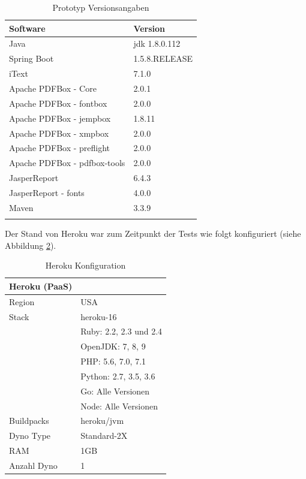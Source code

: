 \documentclass[main.tex]{subfiles}
\begin{document}
\begin{table}[!ht]
\centering
\begin{tabular}{ll}
Software          & Version   \\ \hline
Java        &      jdk 1.8.0.112      \\
Spring Boot &         1.5.8.RELEASE        \\

iText        &        7.1.0  \\
Apache PDFBox - Core &  2.0.1 \\
Apache PDFBox - fontbox & 2.0.0 \\
Apache PDFBox - jempbox & 1.8.11 \\
Apache PDFBox - xmpbox & 2.0.0 \\
Apache PDFBox - preflight & 2.0.0 \\
Apache PDFBox - pdfbox-tools & 2.0.0 \\
JasperReport & 6.4.3 \\
JasperReport - fonts & 4.0.0 \\
Maven   &  3.3.9 \\
 & \\


\end{tabular}
\caption{Prototyp Versionsangaben}
\label{softversion}

\end{table}
Der Stand von Heroku war zum Zeitpunkt der Tests wie folgt konfiguriert (siehe Abbildung \ref{herokuversion}).
\begin{table}[!hb]
\centering

\begin{tabular}{ll}

Heroku (PaaS)    & \\ \hline
Region & USA \\
Stack & heroku-16 \\
 & Ruby: 2.2, 2.3 und 2.4\\
 & OpenJDK: 7, 8, 9\\
 & PHP: 5.6, 7.0, 7.1\\
 & Python: 2.7, 3.5, 3.6\\
 & Go: Alle Versionen\\
 & Node: Alle Versionen \\
Buildpacks & heroku/jvm \\
Dyno Type & Standard-2X \\
RAM & 1GB \\
Anzahl Dyno & 1 \\


\end{tabular}
\caption{Heroku Konfiguration}
\label{herokuversion}
\end{table}
\end{document}
